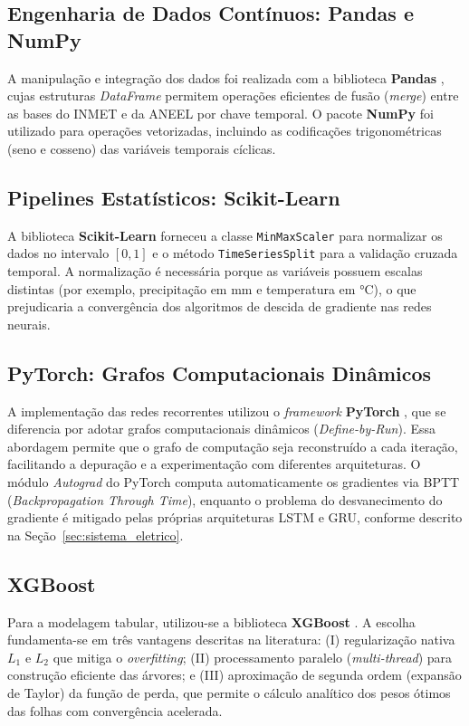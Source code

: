 \subsection{Engenharia de Dados Contínuos: Pandas e NumPy}
A manipulação e integração dos dados foi realizada com a biblioteca \textbf{Pandas} \cite{mckinney2010data}, cujas estruturas \textit{DataFrame} permitem operações eficientes de fusão (\textit{merge}) entre as bases do INMET e da ANEEL por chave temporal. O pacote \textbf{NumPy} \cite{harris2020array} foi utilizado para operações vetorizadas, incluindo as codificações trigonométricas (seno e cosseno) das variáveis temporais cíclicas.

\subsection{Pipelines Estatísticos: Scikit-Learn}
A biblioteca \textbf{Scikit-Learn} \cite{pedregosa2011scikit} forneceu a classe \texttt{MinMaxScaler} para normalizar os dados no intervalo $[0, 1]$ e o método \texttt{Time\-Series\-Split} para a validação cruzada temporal. A normalização é necessária porque as variáveis possuem escalas distintas (por exemplo, precipitação em mm e temperatura em °C), o que prejudicaria a convergência dos algoritmos de descida de gradiente nas redes neurais.

\subsection{PyTorch: Grafos Computacionais Dinâmicos}
A implementação das redes recorrentes utilizou o \textit{framework} \textbf{PyTorch} \cite{paszke2019pytorch}, que se diferencia por adotar grafos computacionais dinâmicos (\textit{Define-by-Run}). Essa abordagem permite que o grafo de computação seja reconstruído a cada iteração, facilitando a depuração e a experimentação com diferentes arquiteturas. O módulo \textit{Autograd} do PyTorch computa automaticamente os gradientes via BPTT (\textit{Backpropagation Through Time}), enquanto o problema do desvanecimento do gradiente é mitigado pelas próprias arquiteturas LSTM e GRU, conforme descrito na Seção~\ref{sec:sistema_eletrico}.

\subsection{XGBoost}
Para a modelagem tabular, utilizou-se a biblioteca \textbf{XGBoost} \cite{chen2016xgboost}. A escolha fundamenta-se em três vantagens descritas na literatura: (I) regularização nativa $L_1$ e $L_2$ que mitiga o \textit{overfitting}; (II) processamento paralelo (\textit{multi-thread}) para construção eficiente das árvores; e (III) aproximação de segunda ordem (expansão de Taylor) da função de perda, que permite o cálculo analítico dos pesos ótimos das folhas com convergência acelerada.

